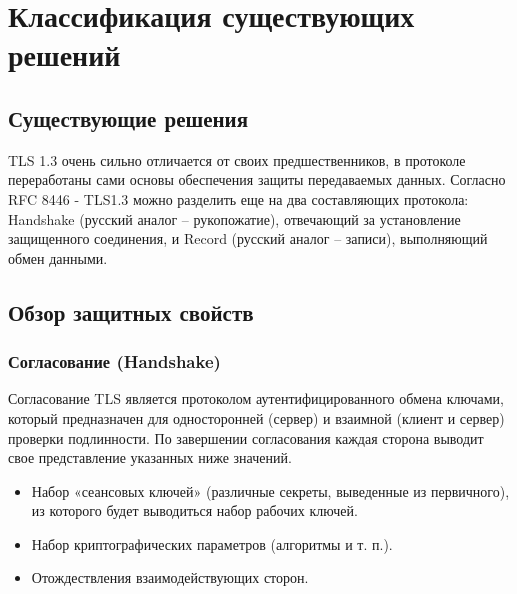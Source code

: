 \chapter{Классификация существующих решений}

    \section{Существующие решения}
    
    TLS 1.3 очень сильно отличается от своих предшественников, в протоколе переработаны сами основы обеспечения защиты передаваемых данных. Согласно RFC 8446 - TLS1.3 можно разделить еще на два составляющих протокола: Handshake (русский аналог – рукопожатие), отвечающий за установление защищенного соединения, и Record (русский аналог – записи), выполняющий обмен данными.
    
    
    

        
    
 
        
        
    \section{Обзор защитных свойств}    
    
    \subsection{Согласование (Handshake)}
    
    Согласование TLS является протоколом аутентифицированного обмена ключами, который предназначен для односторонней (сервер) и взаимной (клиент и сервер) проверки подлинности. По завершении согласования каждая сторона выводит свое представление указанных ниже значений.
    
    
    \begin{itemize}
    	\item Набор «сеансовых ключей» (различные секреты, выведенные из первичного), из которого будет выводиться набор рабочих ключей.
    	\item Набор криптографических параметров (алгоритмы и т. п.).
    	\item Отождествления взаимодействующих сторон.
    \end{itemize}
    
